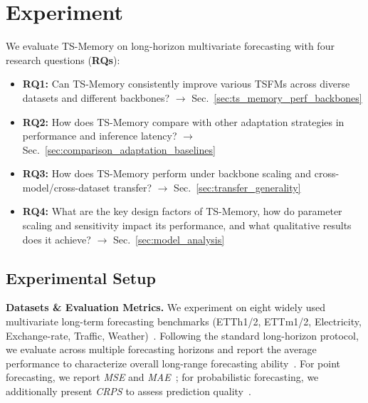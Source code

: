 

\section{Experiment}
\label{sec:experiments}

We evaluate TS-Memory on long-horizon multivariate forecasting with four research questions (\textbf{RQs}):

\begin{itemize}[leftmargin=*]
    \item \textbf{RQ1:} Can TS-Memory consistently improve various TSFMs across diverse datasets and different backbones? $\rightarrow$ Sec.~\ref{sec:ts_memory_perf_backbones}
    \item \textbf{RQ2:} How does TS-Memory compare with other adaptation strategies in performance and inference latency? $\rightarrow$ Sec.~\ref{sec:comparison_adaptation_baselines}
    \item \textbf{RQ3:} How does TS-Memory perform under backbone scaling and cross-model/cross-dataset transfer? $\rightarrow$ Sec.~\ref{sec:transfer_generality}
    \item \textbf{RQ4:} What are the key design factors of TS-Memory, how do parameter scaling and sensitivity impact its performance, and what qualitative results does it achieve? $\rightarrow$ Sec.~\ref{sec:model_analysis} 
\end{itemize}

% 





\subsection{Experimental Setup}

\noindent\textbf{Datasets \& Evaluation Metrics.} We experiment on eight widely used multivariate long-term forecasting benchmarks (ETTh1/2, ETTm1/2, Electricity, Exchange-rate, Traffic, Weather)~\cite{zhou2021informer,lai2018modeling}. Following the standard long-horizon protocol, we evaluate across multiple forecasting horizons and report the average performance to characterize overall long-range forecasting ability~\cite{wu2023timesnet}. For point forecasting, we report \textit{MSE} and \textit{MAE}~\cite{hyndman2006another}; for probabilistic forecasting, we additionally present \textit{CRPS} to assess prediction quality~\cite{gneiting2007strictly}.

